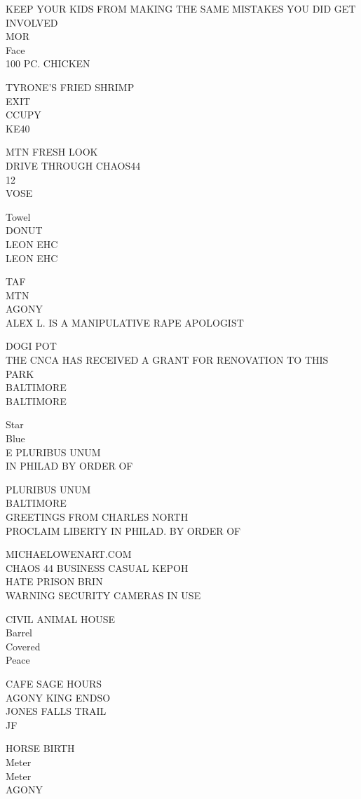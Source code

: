 \documentclass[10pt,letterpaper]{article}
\begin{document}
KEEP YOUR KIDS FROM MAKING THE SAME MISTAKES YOU DID GET INVOLVED\\
MOR\\
Face\\
100 PC. CHICKEN

TYRONE'S FRIED SHRIMP\\
EXIT\\
CCUPY\\
KE40

MTN FRESH LOOK\\
DRIVE THROUGH CHAOS44\\
12\\
VOSE

Towel\\
DONUT\\
LEON EHC\\
LEON EHC

TAF\\
MTN\\
AGONY\\
ALEX L. IS A MANIPULATIVE RAPE APOLOGIST

DOGI POT\\
THE CNCA HAS RECEIVED A GRANT FOR RENOVATION TO THIS PARK\\
BALTIMORE\\
BALTIMORE

Star\\
Blue\\
E PLURIBUS UNUM\\
IN PHILAD BY ORDER OF

PLURIBUS UNUM\\
BALTIMORE\\
GREETINGS FROM CHARLES NORTH\\
PROCLAIM LIBERTY IN PHILAD. BY ORDER OF

MICHAELOWENART.COM\\
CHAOS 44 BUSINESS CASUAL KEPOH\\
HATE PRISON BRIN\\
WARNING SECURITY CAMERAS IN USE

CIVIL ANIMAL HOUSE\\
Barrel\\
Covered\\
Peace

CAFE SAGE HOURS\\
AGONY KING ENDSO\\
JONES FALLS TRAIL\\
JF

HORSE BIRTH\\
Meter\\
Meter\\
AGONY
\end{document}
